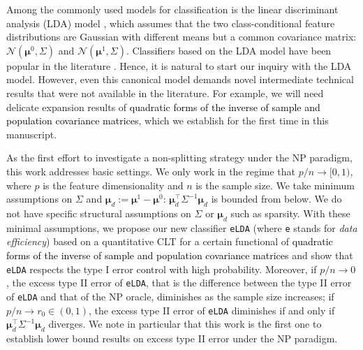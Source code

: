 \documentclass[12pt]{article}
\numberwithin{equation}{section}
\theoremstyle{remark}
\newcommand{\1}{{\rm 1}\kern-0.24em{\rm I}}
\begin{document}
 
Among the commonly used models for classification is the linear discriminant analysis (LDA) model \citep{Hastie.Tibshirani.ea.2009, james2014introduction, Fan.Li.Zhang.Zou.2020}, which assumes that the two class-conditional feature distributions are Gaussian with different means but a common covariance matrix: $\mathcal{N}(\bm{\mu}^0, \Sigma)$ and $\mathcal{N}(\bm{\mu}^1, \Sigma)$. Classifiers based on the LDA model have been popular in the literature \citep{Shao.Wang.ea.2011, Fan.Feng.ea.2011, Witten.Tibshirani.2012,mai2012direct, Hao.Dong.Fan.2015,pan2016ultrahigh, Wang.Jiang.2018,  tony2019high, li2018sparse, JMLR:v21:19-428}. Hence, it is natural to start our inquiry with the LDA model. However, even this canonical model demands novel intermediate technical results that were not available in the literature.  For example, we will need delicate expansion results of \textcolor{black}{quadratic forms of the inverse of sample and population covariance matrices}, which we establish for the first time in this manuscript. %

As the first effort to investigate a non-splitting strategy under the NP paradigm, this work addresses basic settings.  We only work in the regime that $p/n\rightarrow [0,1)$, where $p$ is the feature dimensionality and $n$ is the sample size.  We take minimum assumptions on $\Sigma$ and $\bm{\mu}_d := \bm{\mu}^1 - \bm{\mu}^0$: $\bm{\mu}_d^{\top} \Sigma^{-1}\bm{\mu}_d$ is bounded from below.  %
We do not have specific structural assumptions on $\Sigma$ or $\bm{\mu}_d$ such as sparsity.  With these minimal assumptions, we propose our new classifier \verb+eLDA+ (where \verb+e+ stands for \textit{data efficiency}) based on a quantitative CLT for a certain functional of \textcolor{black}{quadratic forms of the inverse of sample and population covariance matrices} and show that \verb+eLDA+ respects the type I error control with high probability.  Moreover, if $p/n\rightarrow 0$, the excess type II error of \verb+eLDA+, that is the difference between the type II error of \verb+eLDA+ and that of the NP oracle, diminishes as the sample size increases; if $p/n\rightarrow r_0\in (0,1)$, the excess type II error of \verb+eLDA+ diminishes if and only if ${\bm{\mu}}_d^{\top} \Sigma^{-1} {\bm{\mu}}_d$ diverges.  We note in particular that this work is the first one to establish lower bound results on excess type II error under the NP  paradigm.  
\end{document}
